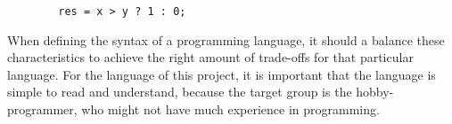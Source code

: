 \begin{code}
	\begin{lstlisting}
		res = x > y ? 1 : 0;
	\end{lstlisting}
\end{code}

When defining the syntax of a programming language, it should a balance these characteristics to achieve the right amount of trade-offs for that particular language. For the language of this project, it is important that the language is simple to read and understand, because the target group is the hobby-programmer, who might not have much experience in programming.